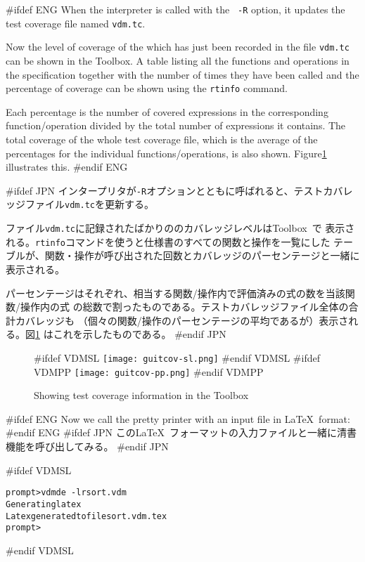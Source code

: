 \documentclass[\pformat,12pt]{article}
\newcommand{\Toolbox}{Toolbox}
\newcommand{\vdmde}{vdmde}
\newcommand{\Toolbox}{Toolbox}
\newcommand{\vdmde}{vppde}
\newcommand{\cmd}{\tt }
\begin{document}
#ifdef ENG
When the interpreter is called with the {\tt 
-R} option, it updates the test coverage file named {\tt vdm.tc}.

Now the level of coverage of the  which has just been recorded in
  the file {\tt vdm.tc} can be shown in the \Toolbox.  A
table listing all the functions and operations in the specification
together with the number of times they have been called and the
percentage of coverage can be shown using the {\cmd rtinfo} command.

Each percentage is the number of covered expressions in the
  corresponding function/operation 
divided by the total number of expressions it contains.  The total
coverage of the whole test coverage file, which is the average of the
percentages for the individual functions/operations, is also
shown. Figure\ref{fig:rtinfo} illustrates this.
#endif ENG

#ifdef JPN
インタープリタが{\tt -R}オプションとともに呼ばれると、テストカバレッジファイル{\tt vdm.tc}を更新する。

ファイル{\tt vdm.tc}に記録されたばかりののカバレッジレベルは\Toolbox\ で
表示される。{\cmd rtinfo}コマンドを使うと仕様書のすべての関数と操作を一覧にした
テーブルが、関数・操作が呼び出された回数とカバレッジのパーセンテージと一緒に
表示される。

パーセンテージはそれぞれ、相当する関数/操作内で評価済みの式の数を当該関数/操作内の式
の総数で割ったものである。テストカバレッジファイル全体の合計カバレッジも
（個々の関数/操作のパーセンテージの平均であるが）表示される。図\ref{fig:rtinfo} 
はこれを示したものである。
#endif JPN

\begin{figure}[tbh]
\begin{center}
#ifdef VDMSL
\texttt{[image: guitcov-sl.png]}
#endif VDMSL
#ifdef VDMPP
\texttt{[image: guitcov-pp.png]}
#endif VDMPP
\caption{Showing test coverage information in the \protect\Toolbox}
\label{fig:rtinfo}
\end{center}
\end{figure}

#ifdef ENG
Now we call the pretty printer with an input file in \LaTeX\ format:
#endif ENG
#ifdef JPN
この\LaTeX\ フォーマットの入力ファイルと一緒に清書機能を呼び出してみる。
#endif JPN

#ifdef VDMSL
\begin{alltt}
prompt> \vdmde\ -lr sort.vdm 
Generating latex
Latex generated to file sort.vdm.tex
prompt>
\end{alltt}
#endif VDMSL
\end{document}
